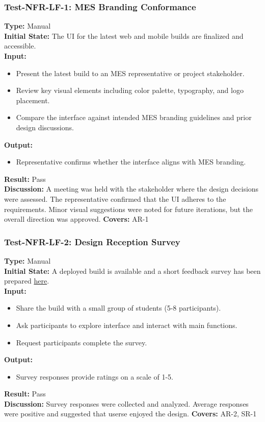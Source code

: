 \documentclass[12pt, titlepage]{article}
\begin{document}
\subsubsection{Test-NFR-LF-1: MES Branding Conformance}
\textbf{Type:} Manual \\
\textbf{Initial State:} The UI for the latest web and mobile builds are finalized and accessible. \\
\textbf{Input:}
\begin{itemize}
    \item Present the latest build to an MES representative or project stakeholder.
    \item Review key visual elements including color palette, typography, and logo placement.
    \item Compare the interface against intended MES branding guidelines and prior design discussions.
\end{itemize}
\textbf{Output:}
\begin{itemize}
    \item Representative confirms whether the interface aligns with MES branding.
\end{itemize}
\textbf{Result:} Pass \\
\textbf{Discussion:} A meeting was held with the stakeholder where the design decisions were assessed. The representative confirmed that the UI adheres to the requirements. Minor visual suggestions were noted for future iterations, but the overall direction was approved.
\textbf{Covers:} AR-1 \\

\subsubsection{Test-NFR-LF-2: Design Reception Survey}
\textbf{Type:} Manual \\
\textbf{Initial State:} A deployed build is available and a short feedback survey has been prepared \href{https://forms.gle/GEDjaME9pe6QebEx6}{here}. \\
\textbf{Input:}
\begin{itemize}
    \item Share the build with a small group of students (5-8 participants).
    \item Ask participants to explore interface and interact with main functions.
    \item Request participants complete the survey.
\end{itemize}
\textbf{Output:}
\begin{itemize}
    \item Survey responses provide ratings on a scale of 1-5.
\end{itemize}
\textbf{Result:} Pass \\
\textbf{Discussion:} Survey responses were collected and analyzed. Average responses were positive and suggested that userse enjoyed the design.
\textbf{Covers:} AR-2, SR-1 \\
\end{document}
